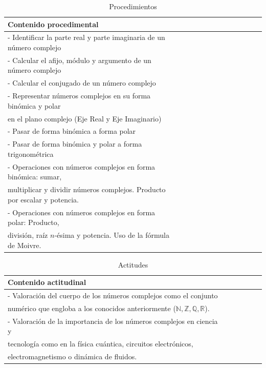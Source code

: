 \documentclass[../main.tex]{memoir}
\begin{document}
\begin{table}[H]
	\centering
	\begin{tabular}{lcccccccccccc}
		\toprule
		\hspace{4cm}Contenido procedimental \\
		\midrule
		- Identificar la parte real y parte imaginaria de un número complejo \\
		- Calcular el afijo, módulo y argumento de un número complejo \\
		- Calcular el conjugado de un número complejo \\
		- Representar números complejos en su forma binómica y polar\\
		\hspace{0.2cm} en el plano complejo (Eje Real y Eje Imaginario) \\
		- Pasar de forma binómica a forma polar \\
		- Pasar de forma binómica y polar a forma trigonométrica\\
		- Operaciones con números complejos en forma binómica: sumar, \\ \hspace{0.2cm}multiplicar y dividir números complejos. Producto por escalar y potencia. \\
		- Operaciones con números complejos en forma polar: Producto, \\
		\hspace{0.2cm}división, raíz $n$-ésima y potencia. Uso de la fórmula de Moivre.\\
		\bottomrule
	\end{tabular}
	\caption{Procedimientos}
	\label{tab:procedimientos}
\end{table}

\begin{table}[H]
	\centering
	\begin{tabular}{lccccc}
		\toprule
		\hspace{4cm}Contenido actitudinal \\
		\midrule
		- Valoración del cuerpo de los números complejos como el conjunto \\ \hspace{0.2cm} numérico que engloba a los conocidos anteriormente ($\mathbb{N}, \mathbb{Z}, \mathbb{Q}, \mathbb{R}$). \\
		- Valoración de la importancia de los números complejos en ciencia y \\ \hspace{0.2cm} tecnología como en la física cuántica, circuitos electrónicos, \\ \hspace{0.2cm} electromagnetismo o dinámica de fluidos. \\
		\bottomrule
	\end{tabular}
	\caption{Actitudes}
	\label{tab:actitudes}
\end{table}
\end{document}
